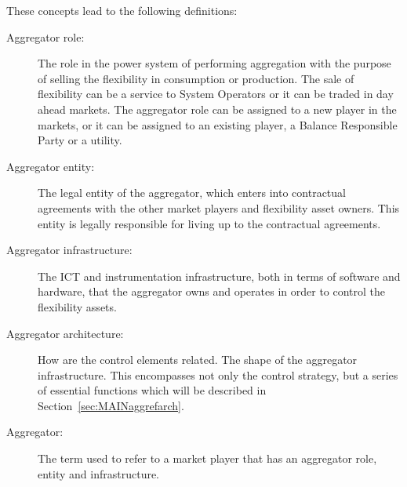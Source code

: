 These concepts lead to the following definitions:
\begin{description}
	\item[Aggregator role:] The role in the power system of performing aggregation with the purpose of selling the flexibility in consumption or production. The sale of flexibility can be a service to System Operators or it can be traded in day ahead markets. The aggregator role can be assigned to a new player in the markets, or it can be assigned to an existing player, \eg a Balance Responsible Party or a utility.
	\item[Aggregator entity:] The legal entity of the aggregator, which enters into contractual agreements with the other market players and flexibility asset owners. This entity is legally responsible for living up to the contractual agreements.
	\item[Aggregator infrastructure:] The ICT and instrumentation infrastructure, both in terms of software and hardware, that the aggregator owns and operates in order to control the flexibility assets. 
	\item[Aggregator architecture:] How are the control elements related.  The shape of the aggregator infrastructure. This encompasses not only the control strategy, but a series of essential functions which will be described in Section~\ref{sec:MAINaggrefarch}.
	\item[Aggregator:] The term used to refer to a market player that has an aggregator role, entity and infrastructure.
\end{description}

